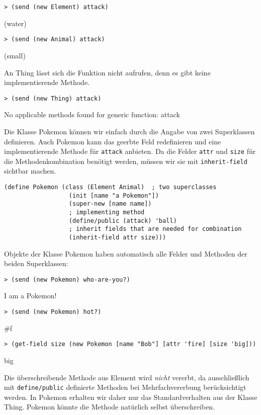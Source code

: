 \begin{lstlisting}
> (send (new Element) attack)
\end{lstlisting}
{\rsymbol (water)}

\begin{lstlisting}
> (send (new Animal) attack)
\end{lstlisting}
{\rsymbol (small)}

An Thing lässt sich die Funktion nicht aufrufen, denn es gibt keine implementierende Methode.

\begin{lstlisting}
> (send (new Thing) attack)
\end{lstlisting}
{\rerror No applicable methods found for generic function: attack}

Die Klasse Pokemon können wir einfach durch die Angabe von zwei Superklassen definieren. Auch Pokemon kann das geerbte Feld redefinieren und eine implementierende Methode für \texttt{attack} anbieten. Da die Felder \texttt{attr} und \texttt{size} für die Methodenkombination benötigt werden, müssen wir sie mit \texttt{inherit-field} sichtbar machen.

\begin{lstlisting}
(define Pokemon (class (Element Animal)  ; two superclasses
                  (init [name "a Pokemon"])
                  (super-new [name name])
                  ; implementing method
                  (define/public (attack) 'ball)
                  ; inherit fields that are needed for combination
                  (inherit-field attr size)))
\end{lstlisting}

Objekte der Klasse Pokemon haben automatisch alle Felder und Methoden der beiden Superklassen:

\begin{lstlisting}
> (send (new Pokemon) who-are-you?)
\end{lstlisting}
{\routput {\qq}I am a Pokemon!\qq}

\begin{lstlisting}
> (send (new Pokemon) hot?)
\end{lstlisting}
{\routput \#f}

\begin{lstlisting}
> (get-field size (new Pokemon [name "Bob"] [attr 'fire] [size 'big]))
\end{lstlisting}
{\rsymbol big}

Die überschreibende Methode aus Element wird \emph{nicht} vererbt, da ausschließlich mit \texttt{define/public} definierte Methoden bei Mehrfachvererbung berücksichtigt werden. In Pokemon erhalten wir daher nur das Standardverhalten aus der Klasse Thing. Pokemon könnte die Methode natürlich selbst überschreiben.

